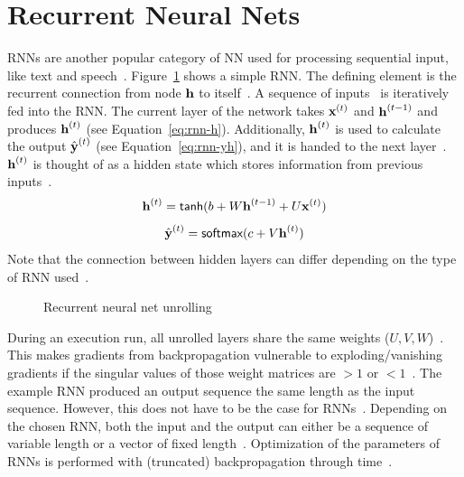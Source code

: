 \section{Recurrent Neural Nets}
\acp{RNN} are another popular category of \ac{NN} used for processing sequential input,
like text and speech~\citep{chauhan_review_2018}.
Figure~\ref{fig:rnn-unrolling} shows a simple \ac{RNN}.
The defining element is the recurrent connection from node $\textbf{h}$ to
itself~\citep{goodfellow_deep_2016}.
A sequence of inputs \X\ is iteratively fed into the \ac{RNN}.
The current layer of the network takes $\textbf{x}^{(t)}$ and $\textbf{h}^{(t-1)}$ and produces $\textbf{h}^{(t)}$
(see Equation~\ref{eq:rnn-h}).
Additionally, $\textbf{h}^{(t)}$ is used to calculate the output $\hat{\textbf{y}}^{(t)}$ (see
Equation~\ref{eq:rnn-yh}), and it is handed to the next layer~\citep{goodfellow_deep_2016}.
$\textbf{h}^{(t)}$ is thought of as a hidden state which stores information from previous
inputs~\citep{goodfellow_deep_2016}.
\begin{equation}\label{eq:rnn-h}
    \textbf{h}^{(t)} = \textsf{tanh}(b+W\textbf{h}^{(t-1)}+U\textbf{x}^{(t)})
\end{equation}
\begin{equation}\label{eq:rnn-yh}
    \hat{\textbf{y}}^{(t)} = \textsf{softmax}(c + V\textbf{h}^{(t)})
\end{equation}
Note that the connection between hidden layers can differ depending on the type of \ac{RNN}
used~\citep{goodfellow_deep_2016}.
\begin{figure}[ht]
    \centering
    \caption[Simple recurrent neural net]{%
        Recurrent neural net unrolling~\citep{goodfellow_deep_2016}\label{fig:rnn-unrolling}
    }
\end{figure}
During an execution run, all unrolled layers share the same weights
($U,V,W$)~\citep{chauhan_review_2018}.
This makes gradients from backpropagation vulnerable to exploding/vanishing gradients if the
singular values of those weight matrices are $>1$ or
$<1$~\citep{goodfellow_deep_2016,pascanu_difficulty_2013}.
The example \ac{RNN} produced an output sequence the same length as the input
sequence.
However, this does not have to be the case for \acp{RNN}~\citep{goodfellow_deep_2016}.
Depending on the chosen \ac{RNN}, both the input and the output can either be a sequence of
variable length or a vector of fixed length~\citep{goodfellow_deep_2016}.
Optimization of the parameters of \acp{RNN} is performed with (truncated) backpropagation through
time~\citep{sherstinsky_fundamentals_2020}.

